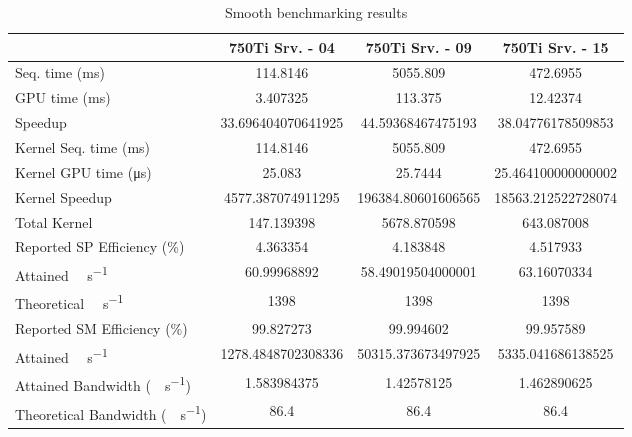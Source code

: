 \begin{table}[H]
	\centering
	\caption{Smooth benchmarking results}
	\label{tab:smooth-results}
	\begin{tabular}{lS[table-format=7.1]S[table-format=7.1]S[table-format=7.1]}
		\toprule
			~ & {\textbf{750Ti Srv. - 04}} & {\textbf{750Ti Srv. - 09}} & {\textbf{750Ti Srv. - 15}} \\
		\midrule
			{Seq. time (\si{\milli\second})} & 114.8146 & 5055.809 & 472.6955 \\
			{GPU time (\si{\milli\second})} & 3.407325 & 113.375 & 12.42374 \\
			{Speedup} & 33.696404070641925 &44.59368467475193 & 38.04776178509853 \\
		\midrule
			{Kernel Seq. time (\si{\milli\second})} & 114.8146 & 5055.809 & 472.6955 \\
			{Kernel GPU time (\si{\micro\second})} & 25.083 & 25.7444 & 25.464100000000002 \\
			{Kernel Speedup} & 4577.387074911295 & 196384.80601606565 & 18563.212522728074 \\
		\midrule
			{Total Kernel \si{\mega\flops}} & 147.139398 & 5678.870598 & 643.087008 \\
			{Reported SP Efficiency (\si{\percent})} & 4.363354 & 4.183848 & 4.517933 \\
			{Attained \si{\giga\flops\per\second}} & 60.99968892 & 58.49019504000001 & 63.16070334 \\
			{Theoretical \si{\giga\flops\per\second}} & 1398 & 1398 & 1398 \\
		\midrule
			{Reported SM Efficiency (\si{\percent})} & 99.827273 & 99.994602 & 99.957589 \\
			{Attained \si{\giga\iops\per\second}} & 1278.4848702308336 & 50315.373673497925 & 5335.041686138525 \\			
		\midrule
			{Attained Bandwidth (\si{\giga\byte\per\second})} & 1.583984375 & 1.42578125  & 1.462890625 \\
			{Theoretical Bandwidth (\si{\giga\byte\per\second})}	& 86.4 & 86.4 & 86.4 \\
		\bottomrule
	\end{tabular}
\end{table}